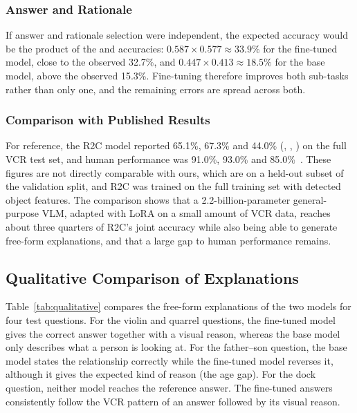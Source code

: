 \subsubsection{Answer and Rationale}
If answer and rationale selection were independent, the expected \QtoAR{} accuracy would be the product of the \QtoA{} and \QAtoR{} accuracies: $0.587 \times 0.577 \approx 33.9\%$ for the fine-tuned model, close to the observed 32.7\%, and $0.447 \times 0.413 \approx 18.5\%$ for the base model, above the observed 15.3\%. Fine-tuning therefore improves both sub-tasks rather than only one, and the remaining errors are spread across both.

\subsubsection{Comparison with Published Results}
For reference, the R2C model reported 65.1\%, 67.3\% and 44.0\% (\QtoA, \QAtoR, \QtoAR) on the full VCR test set, and human performance was 91.0\%, 93.0\% and 85.0\%~\cite{zellers2019vcr}. These figures are not directly comparable with ours, which are on a held-out subset of the validation split, and R2C was trained on the full training set with detected object features. The comparison shows that a 2.2-billion-parameter general-purpose VLM, adapted with LoRA on a small amount of VCR data, reaches about three quarters of R2C's joint accuracy while also being able to generate free-form explanations, and that a large gap to human performance remains.

\subsection{Qualitative Comparison of Explanations}
Table~\ref{tab:qualitative} compares the free-form explanations of the two models for four test questions. For the violin and quarrel questions, the fine-tuned model gives the correct answer together with a visual reason, whereas the base model only describes what a person is looking at. For the father--son question, the base model states the relationship correctly while the fine-tuned model reverses it, although it gives the expected kind of reason (the age gap). For the dock question, neither model reaches the reference answer. The fine-tuned answers consistently follow the VCR pattern of an answer followed by its visual reason.

